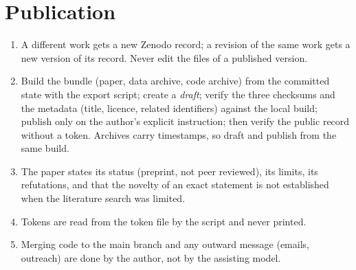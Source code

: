 \documentclass[11pt,a4paper]{article}
\begin{document}
\section{Publication}
\begin{enumerate}
\item A different work gets a new Zenodo record; a revision of the same work gets a new version of its record. Never edit the files of a published version.
\item Build the bundle (paper, data archive, code archive) from the committed state with the export script; create a \emph{draft}; verify the three checksums and the metadata (title, licence, related identifiers) against the local build; publish only on the author's explicit instruction; then verify the public record without a token. Archives carry timestamps, so draft and publish from the same build.
\item The paper states its status (preprint, not peer reviewed), its limits, its refutations, and that the novelty of an exact statement is not established when the literature search was limited.
\item Tokens are read from the token file by the script and never printed.
\item Merging code to the main branch and any outward message (emails, outreach) are done by the author, not by the assisting model.
\end{enumerate}
\end{document}
